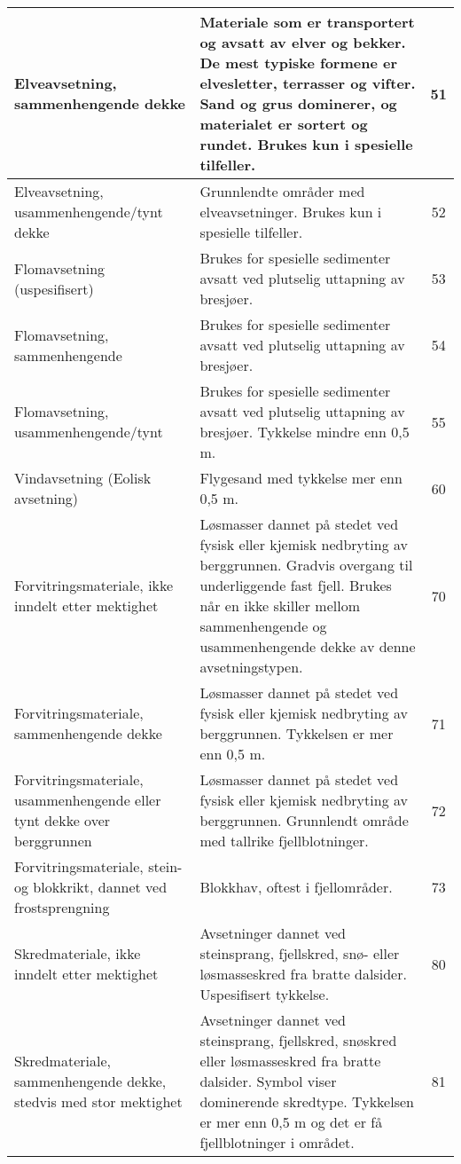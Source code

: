 \begin{longtable}{|p{3.5cm}|p{6.2cm}|c|}
    Elveavsetning, sammenhengende dekke & Materiale som er transportert og avsatt av elver og bekker. De mest typiske formene er elvesletter, terrasser og vifter. Sand og grus dominerer, og materialet er sortert og rundet. Brukes kun i spesielle tilfeller. & 51 \\ \hline
    Elveavsetning, usammenhengende/tynt dekke & Grunnlendte områder med elveavsetninger. Brukes kun i spesielle tilfeller. & 52 \\ \hline
    Flomavsetning (uspesifisert) & Brukes for spesielle sedimenter avsatt ved plutselig uttapning av bresjøer. & 53 \\ \hline
    Flomavsetning, sammenhengende & Brukes for spesielle sedimenter avsatt ved plutselig uttapning av bresjøer. & 54 \\ \hline
    Flomavsetning, usammenhengende/tynt & Brukes for spesielle sedimenter avsatt ved plutselig uttapning av bresjøer. Tykkelse mindre enn 0,5 m. & 55 \\ \hline
    Vindavsetning (Eolisk avsetning) & Flygesand med tykkelse mer enn 0,5 m. & 60 \\ \hline
    Forvitringsmateriale, ikke inndelt etter mektighet & Løsmasser dannet på stedet ved fysisk eller kjemisk nedbryting av berggrunnen. Gradvis overgang til underliggende fast fjell. Brukes når en ikke skiller mellom sammenhengende og usammenhengende dekke av denne avsetningstypen. & 70 \\ \hline
    Forvitringsmateriale, sammenhengende dekke & Løsmasser dannet på stedet ved fysisk eller kjemisk nedbryting av berggrunnen. Tykkelsen er mer enn 0,5 m. & 71 \\ \hline
    Forvitringsmateriale, usammenhengende eller tynt dekke over berggrunnen & Løsmasser dannet på stedet ved fysisk eller kjemisk nedbryting av berggrunnen. Grunnlendt område med tallrike fjellblotninger. & 72 \\ \hline
    Forvitringsmateriale, stein- og blokkrikt, dannet ved frostsprengning & Blokkhav, oftest i fjellområder. & 73 \\ \hline
    Skredmateriale, ikke inndelt etter mektighet & Avsetninger dannet ved steinsprang, fjellskred, snø- eller løsmasseskred fra bratte dalsider. Uspesifisert tykkelse. & 80 \\ \hline
    Skredmateriale, sammenhengende dekke, stedvis med stor mektighet & Avsetninger dannet ved steinsprang, fjellskred, snøskred eller løsmasseskred fra bratte dalsider. Symbol viser dominerende skredtype. Tykkelsen er mer enn 0,5 m og det er få fjellblotninger i området. & 81 \\ \hline

\end{longtable}
